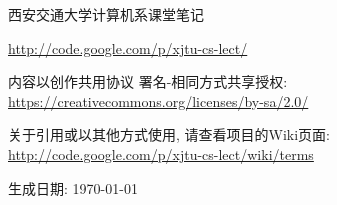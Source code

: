 \clearpage

\sf \Large

西安交通大学计算机系课堂笔记

\url{http://code.google.com/p/xjtu-cs-lect/}

\vskip 1cm


内容以创作共用协议 署名-相同方式共享授权: \\
\indent\url{https://creativecommons.org/licenses/by-sa/2.0/}

\vskip 1cm

关于引用或以其他方式使用, 请查看项目的Wiki页面: \\
\indent\url{http://code.google.com/p/xjtu-cs-lect/wiki/terms}

\vskip 14cm

\hfill 生成日期: \today

\rm \normalsize
\thispagestyle{empty}
\setcounter{page}{0}
\clearpage
